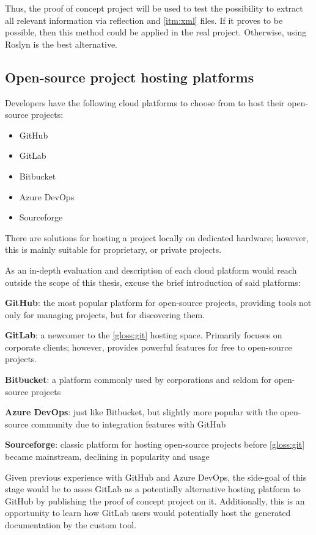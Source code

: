 Thus, the proof of concept project will be used to test the possibility to extract all relevant information via reflection and \ref{itm:xml} files. If it proves to be possible, then this method could be applied in the real project. Otherwise, using Roslyn is the best alternative.

\subsection{Open-source project hosting platforms}
Developers have the following cloud platforms to choose from to host their open-source projects:
\begin{itemize}
    \item GitHub
    \item GitLab
    \item Bitbucket
    \item Azure DevOps
    \item Sourceforge
\end{itemize}

There are solutions for hosting a project locally on dedicated hardware; however, this is mainly suitable for proprietary, or private projects.

As an in-depth evaluation and description of each cloud platform would reach outside the scope of this thesis, excuse the brief introduction of said platforms:

\textbf{GitHub}: the most popular platform for open-source projects, providing tools not only for managing projects, but for discovering them.

\textbf{GitLab}: a newcomer to the \ref{gloss:git} hosting space. Primarily focuses on corporate clients; however, provides powerful features for free to open-source projects.

\textbf{Bitbucket}: a platform commonly used by corporations and seldom for open-source projects

\textbf{Azure DevOps}: just like Bitbucket, but slightly more popular with the open-source community due to integration features with GitHub

\textbf{Sourceforge}: classic platform for hosting open-source projects before \ref{gloss:git} became mainstream, declining in popularity and usage

Given previous experience with GitHub and Azure DevOps, the side-goal of this stage would be to asses GitLab as a potentially alternative hosting platform to GitHub by publishing the proof of concept project on it. Additionally, this is an opportunity to learn how GitLab users would potentially host the generated documentation by the custom tool.

